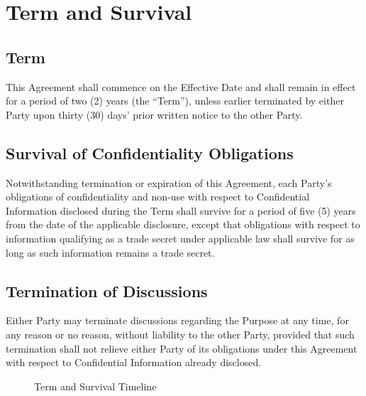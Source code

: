 \section{Term and Survival}

\subsection{Term} This Agreement shall commence on the Effective Date and shall remain in effect for a period of two (2) years (the ``Term''), unless earlier terminated by either Party upon thirty (30) days' prior written notice to the other Party.

\subsection{Survival of Confidentiality Obligations} Notwithstanding termination or expiration of this Agreement, each Party's obligations of confidentiality and non-use with respect to Confidential Information disclosed during the Term shall survive for a period of five (5) years from the date of the applicable disclosure, except that obligations with respect to information qualifying as a trade secret under applicable law shall survive for as long as such information remains a trade secret.

\subsection{Termination of Discussions} Either Party may terminate discussions regarding the Purpose at any time, for any reason or no reason, without liability to the other Party, provided that such termination shall not relieve either Party of its obligations under this Agreement with respect to Confidential Information already disclosed.

\begin{figure}[h]
  \centering
  \caption{Term and Survival Timeline}
  \label{fig:term_timeline}
\end{figure}
